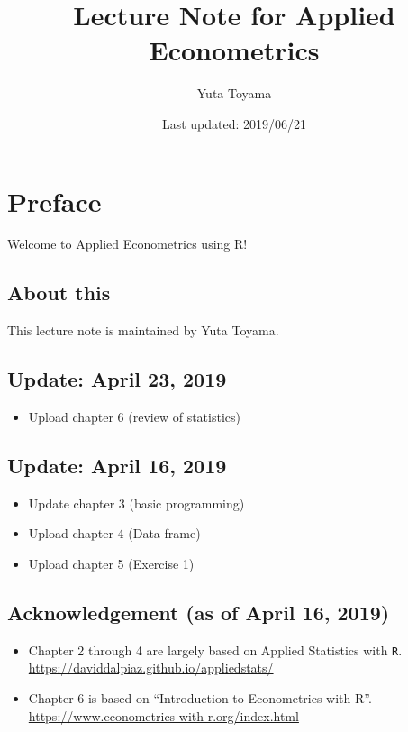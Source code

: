 \documentclass[]{book}
\title{Lecture Note for Applied Econometrics}
\author{Yuta Toyama}
\date{Last updated: 2019/06/21}
\providecommand{\tightlist}{%
  \setlength{\itemsep}{0pt}\setlength{\parskip}{0pt}}
\begin{document}
\maketitle

{
\setcounter{tocdepth}{1}
\tableofcontents
}
\chapter{Preface}\label{preface}

Welcome to Applied Econometrics using R!

\section{About this}\label{about-this}

This lecture note is maintained by Yuta Toyama.

\section{Update: April 23, 2019}\label{update-april-23-2019}

\begin{itemize}
\tightlist
\item
  Upload chapter 6 (review of statistics)
\end{itemize}

\section{Update: April 16, 2019}\label{update-april-16-2019}

\begin{itemize}
\tightlist
\item
  Update chapter 3 (basic programming)
\item
  Upload chapter 4 (Data frame)
\item
  Upload chapter 5 (Exercise 1)
\end{itemize}

\section{Acknowledgement (as of April 16,
2019)}\label{acknowledgement-as-of-april-16-2019}

\begin{itemize}
\tightlist
\item
  Chapter 2 through 4 are largely based on Applied Statistics with
  \texttt{R}. \url{https://daviddalpiaz.github.io/appliedstats/}
\item
  Chapter 6 is based on ``Introduction to Econometrics with R''.
  \url{https://www.econometrics-with-r.org/index.html}
\end{itemize}
\end{document}
